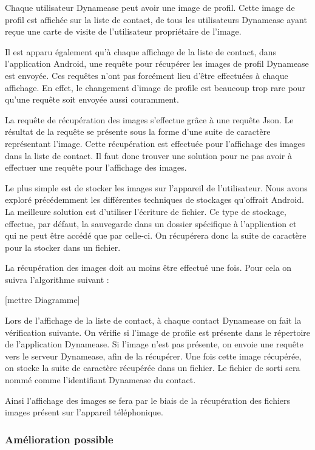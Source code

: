 Chaque utilisateur Dynamease peut avoir une image de profil. Cette image de profil est affichée sur la liste de contact, de tous les utilisateurs Dynamease ayant reçue une carte de visite de l'utilisateur propriétaire de l'image.

Il est apparu également qu'à chaque affichage de la liste de contact, dans l'application Android, une requête pour récupérer les images de profil Dynamease est envoyée. Ces requêtes n'ont pas forcément lieu d'être effectuées à chaque affichage. En effet, le changement d'image de profile est beaucoup trop rare pour qu'une requête soit envoyée aussi couramment.

La requête de récupération des images s'effectue grâce à une requête Json. Le résultat de la requête se présente sous la forme d'une suite de caractère représentant l'image. Cette récupération est effectuée pour l'affichage des images dans la liste de contact. Il faut donc trouver une solution pour ne pas avoir à effectuer une requête pour l'affichage des images.

Le plus simple est de stocker les images sur l'appareil de l'utilisateur. Nous avons exploré précédemment les différentes techniques de stockages qu'offrait Android. La meilleure solution est d'utiliser l'écriture de fichier. Ce type de stockage, effectue, par défaut, la sauvegarde dans un dossier spécifique à l'application et qui ne peut être accédé que par celle-ci. On récupérera donc la suite de caractère pour la stocker dans un fichier. 

La récupération des images doit au moins être effectué une fois. Pour cela on suivra l'algorithme suivant :

[mettre Diagramme]

Lors de l'affichage de la liste de contact, à chaque contact Dynamease on fait la vérification suivante. On vérifie si l'image de profile est présente dans le répertoire de l'application Dynamease. Si l'image n'est pas présente, on envoie une requête vers le serveur Dynamease, afin de la récupérer. Une fois cette image récupérée, on stocke la suite de caractère récupérée dans un fichier. Le fichier de sorti sera nommé comme l'identifiant Dynamease du contact.

Ainsi l'affichage des images se fera par le biais de la récupération des fichiers images présent sur l'appareil téléphonique.

\subsubsection{Amélioration possible}

